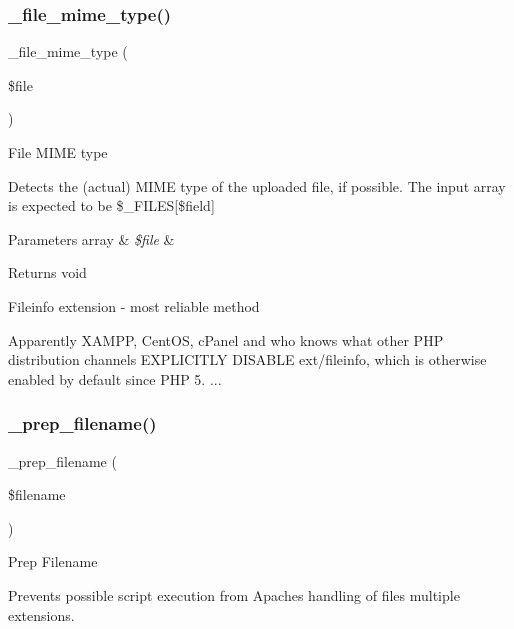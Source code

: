 \subsubsection{\texorpdfstring{\+\_\+file\+\_\+mime\+\_\+type()}{\_file\_mime\_type()}}
{\footnotesize\ttfamily \+\_\+file\+\_\+mime\+\_\+type (\begin{DoxyParamCaption}\item[{}]{\$file }\end{DoxyParamCaption})\hspace{0.3cm}{\ttfamily [protected]}}

File M\+I\+ME type

Detects the (actual) M\+I\+ME type of the uploaded file, if possible. The input array is expected to be \$\+\_\+\+F\+I\+L\+ES\mbox{[}\$field\mbox{]}


\begin{DoxyParams}[1]{Parameters}
array & {\em \$file} & \\
\hline
\end{DoxyParams}
\begin{DoxyReturn}{Returns}
void 
\end{DoxyReturn}
Fileinfo extension -\/ most reliable method

Apparently X\+A\+M\+PP, Cent\+OS, c\+Panel and who knows what other P\+HP distribution channels E\+X\+P\+L\+I\+C\+I\+T\+LY D\+I\+S\+A\+B\+LE ext/fileinfo, which is otherwise enabled by default since P\+HP 5. ...\mbox{\label{class_c_i___upload_a00936ce870d818794909bf16dc2ff70b}} 
\subsubsection{\texorpdfstring{\+\_\+prep\+\_\+filename()}{\_prep\_filename()}}
{\footnotesize\ttfamily \+\_\+prep\+\_\+filename (\begin{DoxyParamCaption}\item[{}]{\$filename }\end{DoxyParamCaption})\hspace{0.3cm}{\ttfamily [protected]}}

Prep Filename

Prevents possible script execution from Apache\textquotesingle{}s handling of files\textquotesingle{} multiple extensions.

